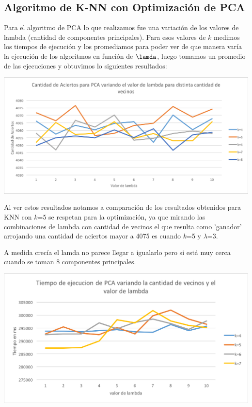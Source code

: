 \subsection {Algoritmo de K-NN con Optimización de PCA}

Para el algoritmo de PCA lo que realizamos fue una variación de los valores de lambda (cantidad de componentes principales). Para esos valores de $k$ medimos los tiempos de ejecución y los promediamos para poder ver de que manera varía la ejecución de los algoritmos en función de $\lamda$, luego tomamos un promedio de las ejecuciones y obtuvimos lo siguientes resultados:

\begin{center}
\includegraphics[scale=0.6]{imagenes/AciertosPCA.png}
\end{center}

Al ver estos resultados notamos a comparación de los resultados obtenidos para KNN con $k$=5 se respetan para la optimización, ya que mirando las combinaciones de lambda con cantidad de vecinos el que resulta como 'ganador' arrojando una cantidad de aciertos mayor a 4075 es cuando $k$=5 y $\lambda$=3. 

A medida crecía el lamda no parece llegar a igualarlo pero si está muy cerca cuando se toman 8 componentes principales. 

\begin{center}
\includegraphics[scale=0.6]{imagenes/TiemposPCA.png}
\end{center}

